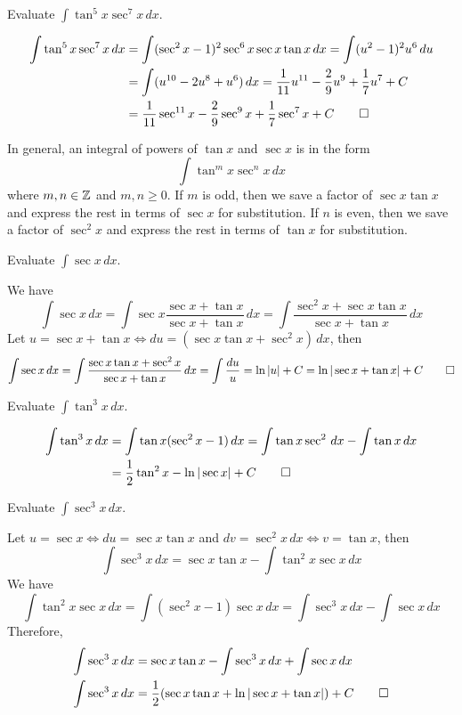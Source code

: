 \begin{problem}
    Evaluate \(\displaystyle{\int\tan^5 x\sec^7 x\,dx}\).
\end{problem}
\begin{solution}
    \begin{align*}
        \int\tan^5 x\sec^7 x\,dx
        &= \int(\sec^2 x-1)^2\sec^6 x\sec x\tan x\,dx
        =\int(u^2-1)^2u^6\,du \\
        &= \int(u^{10}-2u^8+u^6)\,dx
        =\frac{1}{11}u^{11}-\frac{2}{9}u^9+\frac{1}{7}u^7+C \\
        &= \frac{1}{11}\sec^{11}x-\frac{2}{9}\sec^9 x+\frac{1}{7}\sec^7 x
        +C \qedhere
    \end{align*}
\end{solution}
In general, an integral of powers of \(\tan x\) and \(\sec x\) is in the
form
\[\int\tan^m x\sec^n x\,dx\]
where \(m,n\in\mathbb{Z}\) and \(m,n\geq 0\).
If \(m\) is odd, then we save a factor of \(\sec x\tan x\) and express the
rest in terms of \(\sec x\) for substitution.
If \(n\) is even, then we save a factor of \(\sec^2 x\) and express the
rest in terms of \(\tan x\) for substitution.
\begin{problem}
    Evaluate \(\displaystyle{\int\sec x\,dx}\).
\end{problem}
\begin{solution}
    We have
    \[\int\sec x\,dx=\int\sec x\frac{\sec x+\tan x}{\sec x+\tan x}\,dx
    =\int\frac{\sec^2 x+\sec x\tan x}{\sec x+\tan x}\,dx\]
    Let \(u=\sec x+\tan x\iff du=(\sec x\tan x+\sec^2 x)\,dx\), then
    \[\int\sec x\,dx=\int\frac{\sec x\tan x+\sec^2 x}{\sec x+\tan x}\,dx
    =\int\frac{du}{u}=\ln|u|+C=\ln|\sec x+\tan x|+C\qedhere\]
\end{solution}
\begin{problem}
    Evaluate \(\displaystyle{\int\tan^3 x\,dx}\).
\end{problem}
\begin{solution}
    \begin{align*}
    \int\tan^3 x\,dx &= \int\tan x(\sec^2x-1)\,dx
    =\int\tan x\sec^2\,dx-\int\tan x\,dx \\
    &= \frac{1}{2}\tan^2 x-\ln|\sec x|+C \qedhere
    \end{align*}
\end{solution}
\begin{problem}
    Evaluate \(\displaystyle{\int\sec^3 x\,dx}\).
\end{problem}
\begin{solution}
    Let \(u=\sec x\iff du=\sec x\tan x\) and \(dv=\sec^2 x\,dx\iff v=\tan x\),
    then
    \[\int\sec^3 x\,dx=\sec x\tan x-\int\tan^2 x\sec x\,dx\]
    We have
    \[\int\tan^2 x\sec x\,dx=\int(\sec^2 x-1)\sec x\,dx
    =\int\sec^3 x\,dx-\int\sec x\,dx\]
    Therefore,
    \begin{align*}
        \int\sec^3 x\,dx &= \sec x\tan x-\int\sec^3 x\,dx+\int\sec x\,dx \\
        \int\sec^3 x\,dx
        &= \frac{1}{2}(\sec x\tan x+\ln|\sec x+\tan x|)+C \qedhere
    \end{align*}
\end{solution}

